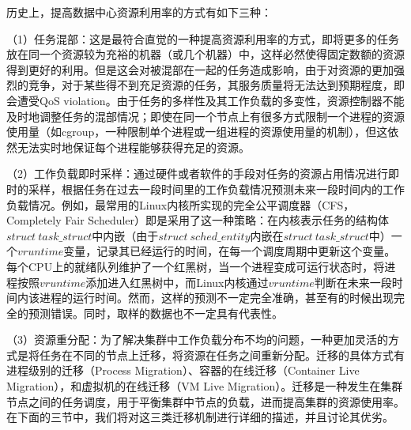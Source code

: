 历史上，提高数据中心资源利用率的方式有如下三种：

（1）任务混部：这是最符合直觉的一种提高资源利用率的方式，即将更多的任务放在同一个资源较为充裕的机器（或几个机器）中，这样必然使得固定数额的资源得到更好的利用。但是这会对被混部在一起的任务造成影响，由于对资源的更加强烈的竞争，对于某些得不到充足资源的任务，其服务质量将无法达到预期程度，即会遭受QoS violation。由于任务的多样性及其工作负载的多变性，资源控制器不能及时地调整任务的混部情况；即使在同一个节点上有很多方式限制一个进程的资源使用量（如cgroup，一种限制单个进程或一组进程的资源使用量的机制），但这依然无法实时地保证每个进程能够获得充足的资源。

（2）工作负载即时采样：通过硬件或者软件的手段对任务的资源占用情况进行即时的采样，根据任务在过去一段时间里的工作负载情况预测未来一段时间内的工作负载情况。例如，最常用的Linux内核所实现的完全公平调度器（CFS，Completely Fair Scheduler）即是采用了这一种策略：在内核表示任务的结构体$struct\ task\_struct$中内嵌（由于$struct\ sched\_entity$内嵌在$struct\ task\_struct$中）一个$vruntime$变量，记录其已经运行的时间，在每一个调度周期中更新这个变量。每个CPU上的就绪队列维护了一个红黑树，当一个进程变成可运行状态时，将进程按照$vruntime$添加进入红黑树中，而Linux内核通过$vruntime$判断在未来一段时间内该进程的运行时间。然而，这样的预测不一定完全准确，甚至有的时候出现完全的预测错误。同时，取样的数据也不一定具有代表性。

\label{chap:reallocation}

（3）资源重分配：为了解决集群中工作负载分布不均的问题，一种更加灵活的方式是将任务在不同的节点上迁移，将资源在任务之间重新分配。迁移的具体方式有进程级别的迁移（Process Migration）、容器的在线迁移（Container Live Migration），和虚拟机的在线迁移（VM Live Migration）。迁移是一种发生在集群节点之间的任务调度，用于平衡集群中节点的负载，进而提高集群的资源使用率。在下面的三节中，我们将对这三类迁移机制进行详细的描述，并且讨论其优劣。

